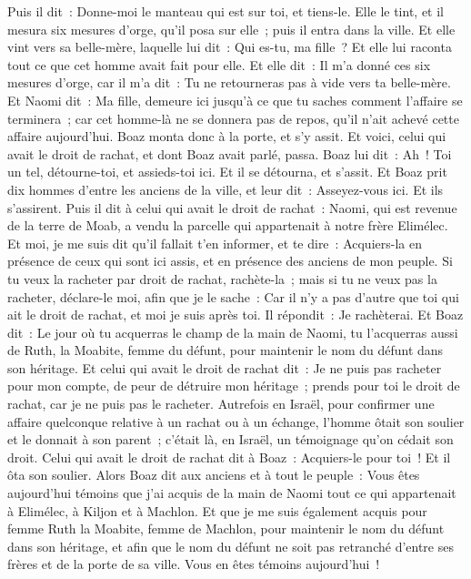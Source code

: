 \begin{multicols}{2}
Puis il dit~: Donne-moi le manteau qui est sur toi, et tiens-le. Elle le tint, et il mesura six mesures d'orge, qu'il posa sur elle~; puis il entra dans la ville.
Et elle vint vers sa belle-mère, laquelle lui dit~: Qui es-tu, ma fille~? Et elle lui raconta tout ce que cet homme avait fait pour elle.
Et elle dit~: Il m'a donné ces six mesures d'orge, car il m'a dit~: Tu ne retourneras pas à vide vers ta belle-mère.
Et Naomi dit~: Ma fille, demeure ici jusqu'à ce que tu saches comment l'affaire se terminera~; car cet homme-là ne se donnera pas de repos, qu'il n'ait achevé cette affaire aujourd'hui.
\VerseOne{}Boaz monta donc à la porte, et s'y assit. Et voici, celui qui avait le droit de rachat, et dont Boaz avait parlé, passa. Boaz lui dit~: Ah~! Toi un tel, détourne-toi, et assieds-toi ici. Et il se détourna, et s'assit.
Et Boaz prit dix hommes d'entre les anciens de la ville, et leur dit~: Asseyez-vous ici. Et ils s'assirent.
Puis il dit à celui qui avait le droit de rachat~: Naomi, qui est revenue de la terre de Moab, a vendu la parcelle qui appartenait à notre frère Elimélec.
Et moi, je me suis dit qu'il fallait t'en informer, et te dire~: Acquiers-la en présence de ceux qui sont ici assis, et en présence des anciens de mon peuple. Si tu veux la racheter par droit de rachat, rachète-la~; mais si tu ne veux pas la racheter, déclare-le moi, afin que je le sache~: Car il n'y a pas d'autre que toi qui ait le droit de rachat, et moi je suis après toi. Il répondit~: Je rachèterai.
Et Boaz dit~: Le jour où tu acquerras le champ de la main de Naomi, tu l'acquerras aussi de Ruth, la Moabite, femme du défunt, pour maintenir le nom du défunt dans son héritage.
Et celui qui avait le droit de rachat dit~: Je ne puis pas racheter pour mon compte, de peur de détruire mon héritage~; prends pour toi le droit de rachat, car je ne puis pas le racheter.
Autrefois en Israël, pour confirmer une affaire quelconque relative à un rachat ou à un échange, l'homme ôtait son soulier et le donnait à son parent~; c'était là, en Israël, un témoignage qu'on cédait son droit.
Celui qui avait le droit de rachat dit à Boaz~: Acquiers-le pour toi~! Et il ôta son soulier.
Alors Boaz dit aux anciens et à tout le peuple~: Vous êtes aujourd'hui témoins que j'ai acquis de la main de Naomi tout ce qui appartenait à Elimélec, à Kiljon et à Machlon.
Et que je me suis également acquis pour femme Ruth la Moabite, femme de Machlon, pour maintenir le nom du défunt dans son héritage, et afin que le nom du défunt ne soit pas retranché d'entre ses frères et de la porte de sa ville. Vous en êtes témoins aujourd'hui~!

\end{multicols}
